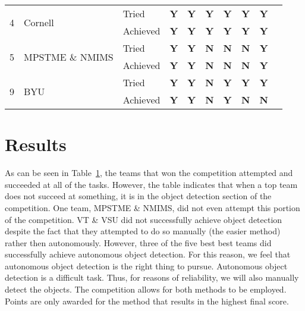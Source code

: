 \documentclass[]{auvsi_doc}
\begin{document}
\begin{table}[h!]
\begin{tabular}{ cllccccccc }
		\hline
		\multirow{2}{*}{4} 		& \multirow{2}{*}{Cornell} 				& Tried		& \color{dg}\textbf{Y} 	& \color{dg}\textbf{Y}  	& \color{dg}\textbf{Y} 	& \color{dg}\textbf{Y} 	& \color{dg}\textbf{Y}  	& \color{dg}\textbf{Y}  \\	 	  	
							&  								& Achieved	& \color{dg}\textbf{Y} 	& \color{dg}\textbf{Y}  	& \color{dg}\textbf{Y} 	& \color{dg}\textbf{Y} 	& \color{dg}\textbf{Y}  	& \color{dg}\textbf{Y}  \\		
		\hline
		\multirow{2}{*}{5} 		& \multirow{2}{*}{MPSTME \& NMIMS} 	& Tried		& \color{dg}\textbf{Y} 	& \color{dg}\textbf{Y}  	& \color{red}\textbf{N} 	& \color{red}\textbf{N} 	& \color{red}\textbf{N}  	& \color{dg}\textbf{Y}  \\
							&  							   	& Achieved	& \color{dg}\textbf{Y} 	& \color{dg}\textbf{Y}  	& \color{red}\textbf{N} 	& \color{red}\textbf{N} 	& \color{red}\textbf{N}  	& \color{dg}\textbf{Y}  \\		
		\hline
		\multirow{2}{*}{9} 		& \multirow{2}{*}{BYU} 				& Tried		& \color{dg}\textbf{Y} 	& \color{dg}\textbf{Y}  	& \color{red}\textbf{N} 	& \color{dg}\textbf{Y} 	& \color{dg}\textbf{Y}  	& \color{dg}\textbf{Y}  \\
							&  								& Achieved	& \color{dg}\textbf{Y} 	& \color{dg}\textbf{Y}  	& \color{red}\textbf{N} 	& \color{dg}\textbf{Y} 	& \color{red}\textbf{N}  	& \color{red}\textbf{N}  \\
		\hline
	\end{tabular}
	\label{table:benchmark}
\end{table}

\section{Results}

As can be seen in Table~\ref{table:benchmark}, the teams that won the competition attempted and succeeded at all of the tasks. However, the table indicates that when a top team does not succeed at something, it is in the object detection section of the competition. One team, MPSTME \& NMIMS, did not even attempt this portion of the competition. VT \& VSU did not successfully achieve object detection despite the fact that they attempted to do so manually (the easier method) rather then autonomously. However, three of the five best best teams did successfully achieve autonomous object detection. For this reason, we feel that autonomous object detection is the right thing to pursue. Autonomous object detection is a difficult task. Thus, for reasons of reliability, we will also manually detect the objects. The competition allows for both methods to be employed. Points are only awarded for the method that results in the highest final score.
\end{document}
